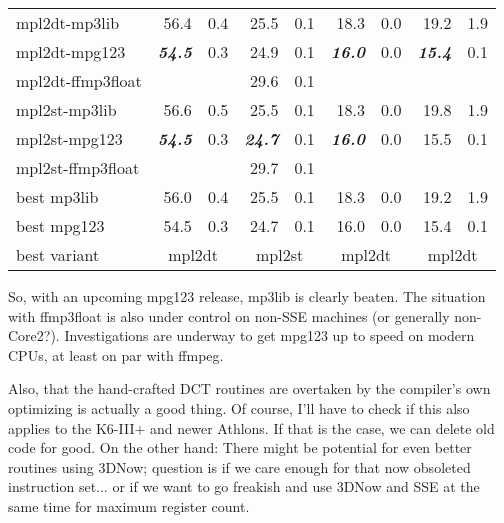 \documentclass[a4paper,12pt]{scrartcl}
\newcommand{\ccenter}[1]{\multicolumn{2}{c}{#1}}
\begin{document}
\begin{center}
\begin{tabular}{lrrrrrrrr}
mpl2dt-mp3lib & 56.4&0.4 & 25.5&0.1               & 18.3&0.0               & 19.2&1.9 \\
mpl2dt-mpg123 & \textbf{\em{54.5}}&0.3 & 24.9&0.1 & \textbf{\em{16.0}}&0.0 & \textbf{\em{15.4}}&0.1 \\
mpl2dt-ffmp3float
              &     &    & 29.6&0.1               &     &                  &     &    \\
mpl2st-mp3lib & 56.6&0.5 & 25.5&0.1               & 18.3&0.0               & 19.8&1.9 \\
mpl2st-mpg123 & \textbf{\em{54.5}}&0.3 & \textbf{\em{24.7}}&0.1 & \textbf{\em{16.0}}&0.0 & 15.5&0.1 \\
mpl2st-ffmp3float
              &     &    & 29.7&0.1               &     &                  &     &    \\
\midrule
best mp3lib & 56.0&0.4   & 25.5&0.1 & 18.3&0.0 & 19.2&1.9 \\
best mpg123 & 54.5&0.3   & 24.7&0.1 & 16.0&0.0 & 15.4&0.1 \\
best variant & \ccenter{mpl2dt} & \ccenter{mpl2st} & \ccenter{mpl2dt} & \ccenter{mpl2dt}
\end{tabular}
\end{center}

So, with an upcoming mpg123 release, mp3lib is clearly beaten.
The situation with ffmp3float is also under control on non-SSE machines (or generally non-Core2?).
Investigations are underway to get mpg123 up to speed on modern CPUs, at least on par with ffmpeg.

Also, that the hand-crafted DCT routines are overtaken by the compiler's own optimizing is actually a good thing. Of course, I'll have to check if this also applies to the K6-III+ and newer Athlons.
If that is the case, we can delete old code for good. On the other hand: There might be potential for even better routines using 3DNow; question is if we care enough for that now obsoleted instruction set... or if we want to go freakish and use 3DNow and SSE at the same time for maximum register count.
\end{document}
